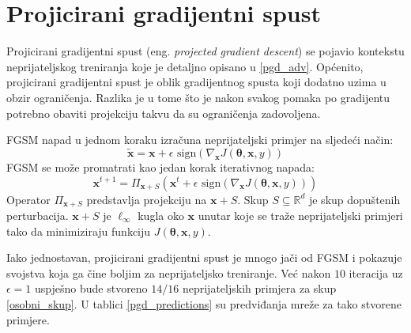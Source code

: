 \documentclass[utf8, diplomski]{fer}
\begin{document}
\section{Projicirani gradijentni spust} Projicirani gradijentni spust (eng. \textit{projected gradient descent}) se pojavio kontekstu neprijateljskog treniranja koje je detaljno opisano u \ref{pgd_adv}. Općenito, projicirani gradijentni spust je oblik gradijentnog spusta koji dodatno uzima u obzir ograničenja. Razlika je u tome što je nakon svakog pomaka po gradijentu potrebno obaviti projekciju takvu da su ograničenja zadovoljena. \par 
FGSM napad u jednom koraku izračuna neprijateljski primjer na sljedeći način:
\begin{equation}
	\boldsymbol{\tilde{x}} = \boldsymbol{x} + \epsilon \text{ sign}(\nabla_{\boldsymbol{x}} J(\boldsymbol{\theta}, \boldsymbol{x}, y)) 
\end{equation}
FGSM se može promatrati kao jedan korak iterativnog napada:
\begin{equation}
	\boldsymbol{x}^{t+1} = \Pi_{\boldsymbol{x}+S} (\boldsymbol{x}^{t} + \epsilon \text{ sign}(\nabla_{\boldsymbol{x}} J(\boldsymbol{\theta}, \boldsymbol{x}, y)))
\end{equation}
Operator $\Pi_{\boldsymbol{x}+S}$ predstavlja projekciju na $\boldsymbol{x}+S$. Skup $S \subseteq \mathbb{R}^{d}$ je skup dopuštenih perturbacija. $\boldsymbol{x}+S$ je $\ell_{\infty}$ kugla oko $\boldsymbol{x}$ unutar koje se traže neprijateljski primjeri tako da minimiziraju funkciju $J(\boldsymbol{\theta}, \boldsymbol{x}, y)$. \par

Iako jednostavan, projicirani gradijentni spust je mnogo jači od FGSM i pokazuje svojstva koja ga čine boljim za neprijateljsko treniranje. Već nakon $10$ iteracija uz $\epsilon = 1$ uspješno bude stvoreno $14/16$ neprijateljskih primjera za skup \ref{osobni_skup}. U tablici \ref{pgd_predictions} su predviđanja mreže za tako stvorene primjere. 
\end{document}
